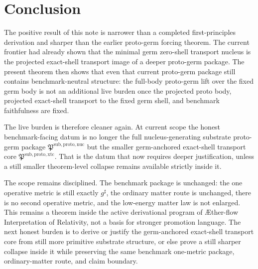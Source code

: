 \documentclass[11pt]{article}
\newcommand{\Aflow}{\AE{}ther-flow}
\newcommand{\TheoryName}{\Aflow{} Interpretation of Relativity}
\newcommand{\CompletedMetric}{g^{\sharp}}
\newcommand{\ProtoPackage}{\mathfrak P^{\mathrm{sub,proto,nuc}}}
\newcommand{\ProtoTransportCore}{\mathfrak P^{\mathrm{sub,proto,xtc}}}
\begin{document}
\section{Conclusion}

The positive result of this note is narrower than a completed first-principles derivation and sharper than the earlier proto-germ forcing theorem. The current frontier had already shown that the minimal germ zero-shell transport nucleus is the projected exact-shell transport image of a deeper proto-germ package. The present theorem then shows that even that current proto-germ package still contains benchmark-neutral structure: the full-body proto-germ lift over the fixed germ body is not an additional live burden once the projected proto body, projected exact-shell transport to the fixed germ shell, and benchmark faithfulness are fixed.

The live burden is therefore cleaner again. At current scope the honest benchmark-facing datum is no longer the full nucleus-generating substrate proto-germ package \(\ProtoPackage\) but the smaller germ-anchored exact-shell transport core \(\ProtoTransportCore\). That is the datum that now requires deeper justification, unless a still smaller theorem-level collapse remains available strictly inside it.

The scope remains disciplined. The benchmark package is unchanged: the one operative metric is still exactly \(\CompletedMetric\), the ordinary matter route is unchanged, there is no second operative metric, and the low-energy matter law is not enlarged. This remains a theorem inside the active derivational program of \TheoryName{}, not a basis for stronger promotion language. The next honest burden is to derive or justify the germ-anchored exact-shell transport core from still more primitive substrate structure, or else prove a still sharper collapse inside it while preserving the same benchmark one-metric package, ordinary-matter route, and claim boundary.
\end{document}

